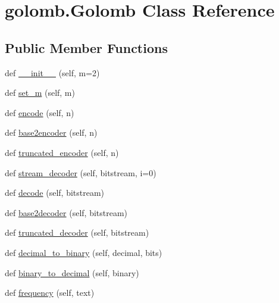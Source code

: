 \hypertarget{classgolomb_1_1Golomb}{}\section{golomb.\+Golomb Class Reference}
\label{classgolomb_1_1Golomb}
\subsection*{Public Member Functions}
\begin{DoxyCompactItemize}
\item 
def \hyperlink{classgolomb_1_1Golomb_a800ebf96bcd5fde678d266835d301343}{\+\_\+\+\_\+init\+\_\+\+\_\+} (self, m=2)
\item 
def \hyperlink{classgolomb_1_1Golomb_ada3ec35e72fd5a5340a285a491caa320}{set\+\_\+m} (self, m)
\item 
def \hyperlink{classgolomb_1_1Golomb_ac90e895ad77bd4424f1ea5830536a4f3}{encode} (self, n)
\item 
def \hyperlink{classgolomb_1_1Golomb_a1f91bc279c5b37d998de933389ad9739}{base2encoder} (self, n)
\item 
def \hyperlink{classgolomb_1_1Golomb_a661925e0fedeca864a7fa7e2bddf84d5}{truncated\+\_\+encoder} (self, n)
\item 
def \hyperlink{classgolomb_1_1Golomb_ad2e9e349b933a32cc542d2f72f8f02d4}{stream\+\_\+decoder} (self, bitstream, i=0)
\item 
def \hyperlink{classgolomb_1_1Golomb_a3517240011034723c1bea63884b8c66c}{decode} (self, bitstream)
\item 
def \hyperlink{classgolomb_1_1Golomb_a50988a7193b544bc61ac9ebfb96d81e1}{base2decoder} (self, bitstream)
\item 
def \hyperlink{classgolomb_1_1Golomb_a18dc23f3d187a8e83e93c2f957df1f10}{truncated\+\_\+decoder} (self, bitstream)
\item 
def \hyperlink{classgolomb_1_1Golomb_a2023173c3c88626f503a788ccd127ed2}{decimal\+\_\+to\+\_\+binary} (self, decimal, bits)
\item 
def \hyperlink{classgolomb_1_1Golomb_a2e6f6f529b979dce3c4eaa1f987eba5b}{binary\+\_\+to\+\_\+decimal} (self, binary)
\item 
def \hyperlink{classgolomb_1_1Golomb_aa3ed6d7b2c9a1cea28df7dbc3962dacc}{frequency} (self, text)
\end{DoxyCompactItemize}
